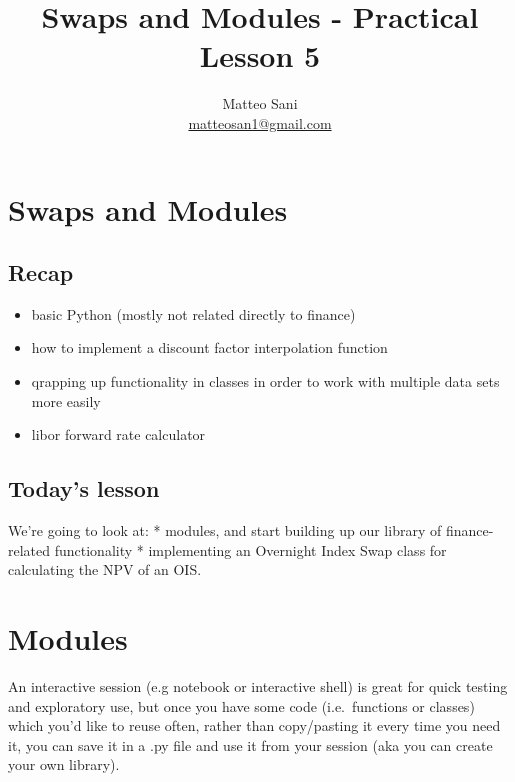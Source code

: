 \documentclass[11pt]{article}
\title{Swaps and Modules - Practical Lesson 5}
\author{Matteo Sani \\ \href{mailto:matteosan1@gmail.com}{matteosan1@gmail.com}}
\providecommand{\tightlist}{%
      \setlength{\itemsep}{0pt}\setlength{\parskip}{0pt}}
\begin{document}
    
    
    \maketitle
    
    

    
    \hypertarget{swaps-and-modules---practical-lesson-5}{%
\section{Swaps and Modules}\label{swaps-and-modules---practical-lesson-5}}

\hypertarget{recap}{%
\subsection{Recap}\label{recap}}

\begin{itemize}
\tightlist
\item
  basic Python (mostly not related directly to finance)
\item
  how to implement a discount factor interpolation function
\item
  qrapping up functionality in classes in order to work with multiple
  data sets more easily
\item
  libor forward rate calculator
\end{itemize}

\hypertarget{todays-lesson}{%
\subsection{Today's lesson}\label{todays-lesson}}

We're going to look at: * modules, and start building up our library of
finance-related functionality * implementing an Overnight Index Swap
class for calculating the NPV of an OIS.

\hypertarget{modules}{%
\section{Modules}\label{modules}}

An interactive session (e.g notebook or interactive shell) is great for
quick testing and exploratory use, but once you have some code
(i.e.~functions or classes) which you'd like to reuse often, rather than
copy/pasting it every time you need it, you can save it in a .py file
and use it from your session (aka you can create your own library).
\end{document}
